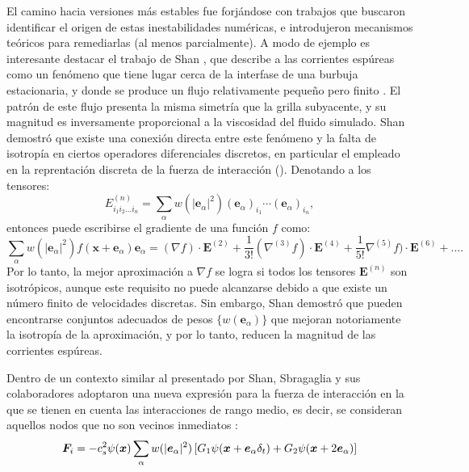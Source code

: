 El camino hacia versiones m\'as estables fue forj\'andose con trabajos que buscaron identificar el origen de estas inestabilidades num\'ericas, e introdujeron mecanismos te\'oricos para remediarlas (al menos parcialmente). A modo de ejemplo es interesante destacar el trabajo de Shan \cite{shan_analysis_2006}, que describe a las corrientes esp\'ureas como un fen\'omeno que tiene lugar cerca de la interfase de una burbuja estacionaria, y donde se produce un flujo relativamente peque\~no pero finito . El patr\'on de este flujo presenta la misma simetr\'ia que la grilla subyacente, y su magnitud es inversamente proporcional a la viscosidad del fluido simulado. Shan demostr\'o que existe una conexi\'on directa entre este fen\'omeno y la falta de isotrop\'ia en ciertos operadores diferenciales discretos, en particular el empleado en la reprentaci\'on discreta de la fuerza de interacci\'on (). Denotando a los tensores: 
\begin{equation}
	E^{(n)}_{i_1i_2\ldots i_n} = \sum_{\alpha}w(|\bm{e}_{\alpha}|^2)(\bm{e}_{\alpha})_{i_1} \cdots (\bm{e}_{\alpha})_{i_n},
\end{equation}
entonces puede escribirse el gradiente de una funci\'on $f$ como:
\begin{equation}
	\sum_{\alpha}w(|\bm{e}_{\alpha}|^2) f(\bm{x}+\bm{e}_{\alpha})\bm{e}_{\alpha}=(\nabla f)\cdot \bm{E}^{(2)} + \dfrac{1}{3!}(\nabla^{(3)} f)\cdot \bm{E}^{(4)} + \dfrac{1}{5!}\nabla^{(5)} f)\cdot \bm{E}^{(6)} + \ldots.
\end{equation}
Por lo tanto, la mejor aproximaci\'on a $\nabla f$ se logra si todos los tensores $\bm{E}^{(n)}$ son isotr\'opicos, aunque este requisito no puede alcanzarse debido a que existe un n\'umero finito de  velocidades discretas. Sin embargo, Shan demostr\'o que pueden encontrarse conjuntos adecuados de pesos $\{ w(\bm{e}_{\alpha})\}$ que mejoran notoriamente la isotrop\'ia de la aproximaci\'on, y por lo tanto, reducen la magnitud de las corrientes esp\'ureas.

Dentro de un contexto similar al presentado por Shan, Sbragaglia y sus colaboradores adoptaron una nueva expresi\'on para la fuerza de interacci\'on en la que se tienen en cuenta las interacciones de rango medio, es decir, se consideran aquellos nodos que no son vecinos inmediatos \cite{sbragaglia_generalized_2007}:
\begin{equation}
	\bm{F}_i = -c_s^2 \psi(\bm{x}) \sum_{\alpha} w(|\bm{e}_{\alpha}|^2) \left[G_1 \psi(\bm{x} + \bm{e}_{\alpha}\delta_t)  + G_2 \psi(\bm{x}+2\bm{e}_{\alpha}) \right]
	\label{eq:fi_sbragaglia}
\end{equation}

